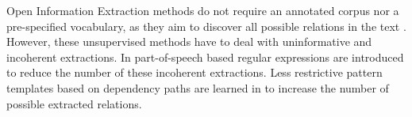 Open Information Extraction methods do not require an annotated corpus nor a pre-specified vocabulary, as they aim to discover all possible relations in the text \citep{Banko2007}.
However, these unsupervised methods have to deal with uninformative and incoherent extractions. In \citep{Fader2011} part-of-speech based regular expressions are introduced to reduce the number of these incoherent extractions. Less restrictive pattern templates based on dependency paths are learned in \citep{Mausam2012} to increase the number of possible extracted relations.
